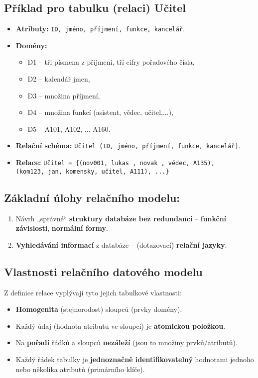 \subsection*{Příklad pro tabulku (relaci) Učitel}
\begin{itemize}
    \item \textbf{Atributy:} \texttt{ID, jméno, příjmení, funkce, kancelář}.
    \item \textbf{Domény:}
          \begin{itemize}
              \item D1 -- tři písmena z příjmení, tří cifry pořadového čísla,
              \item D2 -- kalendář jmen,
              \item D3 -- množina příjmení,
              \item D4 -- množina funkcí (asistent, vědec, učitel,...),
              \item D5 -- A101, A102, ... A160.
          \end{itemize}
    \item \textbf{Relační schéma:} \texttt{Učitel (ID, jméno, příjmení, funkce, kancelář)}.
    \item \textbf{Relace:} \texttt{Učitel = \{(nov001, lukas , novak , vědec, A135),\\ (kom123, jan, komensky, učitel, A111), ...\}}
\end{itemize}

\subsection{Základní úlohy relačního modelu:}
\begin{enumerate}
    \item Návrh „správné“ \textbf{struktury databáze bez redundancí} -- \textbf{funkční závislosti}, \textbf{normální formy}.
    \item \textbf{Vyhledávání informací} z databáze -- (dotazovací) \textbf{relační jazyky}.
\end{enumerate}

\subsection{Vlastnosti relačního datového modelu}
Z definice relace vyplývají tyto jejich tabulkové vlastnosti:
\begin{itemize}
    \item \textbf{Homogenita} (stejnorodost) sloupců (prvky domény).
    \item Každý údaj (hodnota atributu ve sloupci) je \textbf{atomickou položkou}.
    \item Na \textbf{pořadí} řádků a sloupců \textbf{nezáleží} (jsou to množiny prvků/atributů).
    \item Každý řádek tabulky je \textbf{jednoznačně identifikovatelný} hodnotami jednoho nebo několika atributů (primárního klíče).
\end{itemize}

